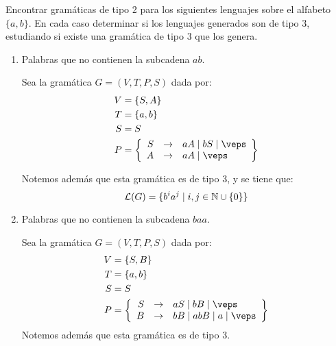 \begin{ejercicio}
    Encontrar gramáticas de tipo 2 para los siguientes lenguajes sobre el alfabeto $\{a, b\}$. En cada caso determinar si los lenguajes generados son de tipo 3, estudiando si existe una gramática de tipo 3 que los genera.
    \begin{enumerate}
        \item Palabras que no contienen la subcadena $ab$.
        
        Sea la gramática $G=\left(V,T,P,S\right)$ dada por:
        \begin{align*}
            V &= \{S, A\} \\
            T &= \{a,b\} \\
            S &= S \\
            P &= \left\{
                \begin{array}{rcl}
                    S &\rightarrow & aA \mid bS \mid \veps \\
                    A &\rightarrow & aA \mid \veps \\
                \end{array}
            \right\}
        \end{align*}

        Notemos además que esta gramática es de tipo $3$, y se tiene que:
        \begin{equation*}
            \mathcal{L}(G) = \{b^i a^j \mid i,j\in \mathbb{N}\cup \{0\}\}
        \end{equation*}


        \item Palabras que no contienen la subcadena $baa$.
        
        Sea la gramática $G=\left(V,T,P,S\right)$ dada por:
        \begin{align*}
            V &= \{S, B\} \\
            T &= \{a,b\} \\
            S &= S \\
            P &= \left\{
                \begin{array}{rcl}
                    S &\rightarrow & aS \mid bB \mid \veps \\
                    B &\rightarrow & bB \mid abB \mid a \mid \veps
                \end{array}
            \right\}
        \end{align*}
        Notemos además que esta gramática es de tipo $3$.
    \end{enumerate}
\end{ejercicio}

